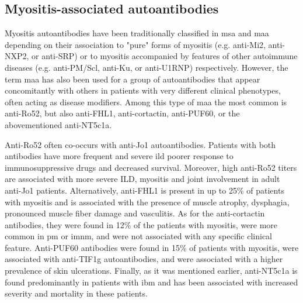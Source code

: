 \subsection{Myositis-associated autoantibodies}

Myositis autoantibodies have been traditionally classified in \gls{msa} and \gls{maa} depending on their association to "pure" forms of myositis (e.g. anti-Mi2, anti-NXP2, or anti-SRP) or to myositis accompanied by features of other autoimmune diseases (e.g. anti-PM/Scl, anti-Ku, or anti-U1RNP) respectively.\cite{McHugh2018} However, the term \gls{maa} has also been used for a group of autoantibodies that appear concomitantly with others in patients with very different clinical phenotypes, often acting as disease modifiers. Among this type of \gls{maa} the most common is anti-Ro52,\cite{PinalFernandez2017a,Vancsa2009,Bauhammer2016,Marie2012} but also anti-FHL1,\cite{Albrecht2015} anti-cortactin,\cite{LabradorHorrillo2014a} anti-PUF60,\cite{Fiorentino2016,Zhang2018} or the abovementioned anti-NT5c1a.\cite{Lloyd2016,Herbert2016,Muro2017,Lilleker2017,Goyal2016}

Anti-Ro52 often co-occurs with anti-Jo1 autoantibodies. Patients with both antibodies have more frequent and severe \gls{ild} poorer response to immunosuppressive drugs and decreased survival.\cite{PinalFernandez2017a,Vancsa2009,Bauhammer2016,Marie2012} Moreover, high anti-Ro52 titers are associated with more severe ILD, myositis and joint involvement in adult anti-Jo1 patients.\cite{PinalFernandez2017a,Vancsa2009,Bauhammer2016,Marie2012} Alternatively, anti-FHL1 is present in up to 25\% of patients with myositis and is associated with the presence of muscle atrophy, dysphagia, pronounced muscle fiber damage and vasculitis.\cite{Albrecht2015} As for the anti-cortactin antibodies, they were found in 12\% of the patients with myositis, were more common in \gls{pm} or \gls{imnm}, and were not associated with any specific clinical feature.\cite{LabradorHorrillo2014a} Anti-PUF60 antibodies were found in 15\% of patients with myositis, were associated with anti-TIF1g autoantibodies, and were associated with a higher prevalence of skin ulcerations.\cite{Fiorentino2016,Zhang2018} Finally, as it was mentioned earlier, anti-NT5c1a is found predominantly in patients with \gls{ibm} and has been associated with increased severity and mortality in these patients.\cite{Lloyd2016,Herbert2016,Muro2017,Lilleker2017,Goyal2016}

